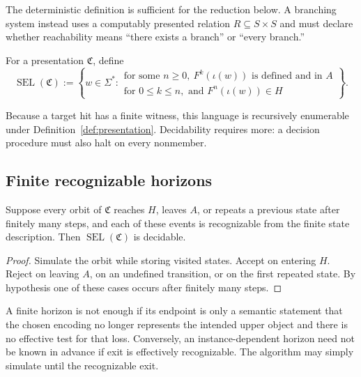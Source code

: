 \documentclass[11pt]{article}
\begin{document}
The deterministic definition is sufficient for the reduction below.  A
branching system instead uses a computably presented relation
$R\subseteq S\times S$ and must declare whether reachability means
``there exists a branch'' or ``every branch.''

\begin{definition}\label{def:sel}
For a presentation $\mathfrak C$, define
\[
\operatorname{SEL}(\mathfrak C)
:=
\left\{
w\in\Sigma^\ast:
\begin{array}{l}
\text{for some }n\geq0,\ F^k(\iota(w))\text{ is defined and in }A\\
\text{for }0\leq k\leq n,\text{ and }F^n(\iota(w))\in H
\end{array}
\right\}.
\]
\end{definition}

Because a target hit has a finite witness, this language is recursively
enumerable under Definition~\ref{def:presentation}.  Decidability requires
more: a decision procedure must also halt on every nonmember.

\subsection{Finite recognizable horizons}

\begin{proposition}
\label{prop:recognizable}
Suppose every orbit of $\mathfrak C$ reaches $H$, leaves $A$, or repeats a
previous state after finitely many steps, and each of these events is
recognizable from the finite state description.  Then
$\operatorname{SEL}(\mathfrak C)$ is decidable.
\end{proposition}

\begin{proof}
Simulate the orbit while storing visited states.  Accept on entering $H$.
Reject on leaving $A$, on an undefined transition, or on the first repeated
state.  By hypothesis one of these cases occurs after finitely many steps.
\end{proof}

\begin{remark}
A finite horizon is not enough if its endpoint is only a semantic statement
that the chosen encoding no longer represents the intended upper object and
there is no effective test for that loss.  Conversely, an instance-dependent
horizon need not be known in advance if exit is effectively recognizable.
The algorithm may simply simulate until the recognizable exit.
\end{remark}
\end{document}
